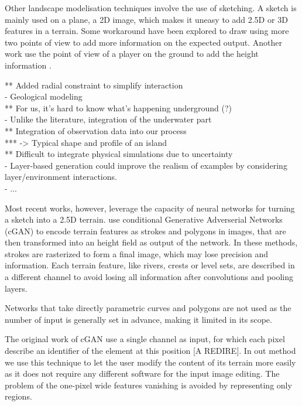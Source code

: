 Other landscape modelisation techniques involve the use of sketching. A sketch is mainly used on a plane, a 2D image, which makes it uneasy to add 2.5D or 3D features in a terrain. Some workaround have been explored to draw using more two points of view \cite{Gain2009} to add more information on the expected output. Another work use the point of view of a player on the ground to add the height information \cite{Tasse2014}. 

** Added radial constraint to simplify interaction \\
- Geological modeling \cite{Patel2021} \\
** For us, it's hard to know what's happening underground (?) \\
- Unlike the literature, integration of the underwater part \\
** Integration of observation data into our process \\
*** -> Typical shape and profile of an island \\
** Difficult to integrate physical simulations due to uncertainty \\
- Layer-based generation could improve the realism of examples by considering layer/environment interactions. \\
- ...


Most recent works, however, leverage the capacity of neural networks for turning a sketch into a 2.5D terrain. \citep{Guerin2017} use conditional Generative Adverserial Networks (cGAN) to encode terrain features as strokes and polygons in images, that are then transformed into an height field as output of the network. In these methods, strokes are rasterized to form a final image, which may lose precision and information. Each terrain feature, like rivers, crests or level sets, are described in a different channel to avoid losing all information after convolutions and pooling layers. 

Networks that take directly parametric curves and polygons are not used as the number of input is generally set in advance, making it limited in its scope.

The original work of cGAN \cite{Isola2017} use a single channel as input, for which each pixel describe an identifier of the element at this position [A REDIRE]. In out method we use this technique to let the user modify the content of its terrain more easily as it does not require any different software for the input image editing. The problem of the one-pixel wide features vanishing is avoided by representing only regions.

